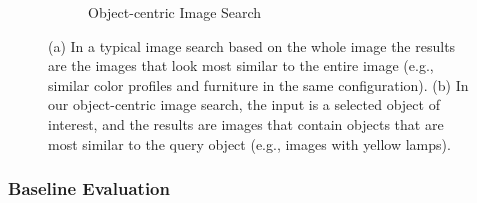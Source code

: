 \documentclass[letterpaper]{article} %
\begin{document}
\begin{figure}
\begin{subfigure}[b]{3.2in}
\begin{subfigure}[b]{2.1in}
        \end{subfigure}
        \caption{Object-centric Image Search}
        \label{fig:objectCentric}
    \end{subfigure}
    \caption[Whole image search vs. object-centric search]{(a) In a typical image search based on the whole image the results are the images that look most similar to the entire image (e.g., similar color profiles and furniture in the same configuration). (b) In our object-centric image search, the input is a selected object of interest, and the results are images that contain objects that are most similar to the query object (e.g., images with yellow lamps).}
    \label{fig:wholeImVsObjectCentric}
\end{figure}

\subsubsection{Baseline Evaluation}



\end{document}
